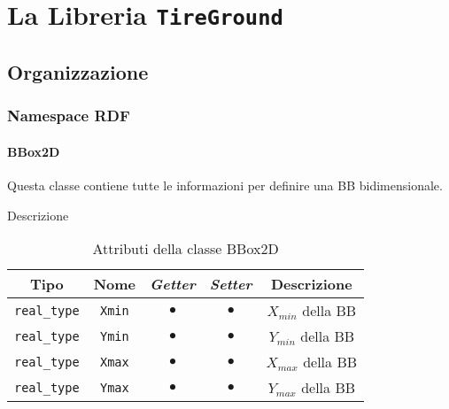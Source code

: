 \chapter{La Libreria \texttt{TireGround}}
\label{Codice}
%
\section{Organizzazione}

%
\subsection{Namespace RDF} 

%
\subsubsection{BBox2D}
Questa classe contiene tutte le informazioni per definire una \ac{BB} bidimensionale.
\begin{description}
	\item[Descrizione] 
\end{description}
\begin{table}[h!]
	\centering
	\begin{tabular}{|c|c|c|c|c|}
		\hline 
		\textbf{Tipo} & \textbf{Nome} & \textit{\textbf{Getter}} & \textit{\textbf{Setter}} & \textbf{Descrizione} \\ 
		\hline 
		\texttt{real\_type} & \texttt{Xmin} & $\bullet$ & $\bullet$ & $X_{min}$ della \ac{BB} \\ 
		\hline 
		\texttt{real\_type} & \texttt{Ymin} & $\bullet$ & $\bullet$ & $Y_{min}$ della \ac{BB} \\ 
		\hline
		\texttt{real\_type} & \texttt{Xmax} & $\bullet$ & $\bullet$ & $X_{max}$ della \ac{BB} \\ 
		\hline
		\texttt{real\_type} & \texttt{Ymax} & $\bullet$ & $\bullet$ & $Y_{max}$ della \ac{BB} \\ 
		\hline
	\end{tabular}
	\caption{Attributi della classe BBox2D}
	\label{BBox2D}
\end{table}
